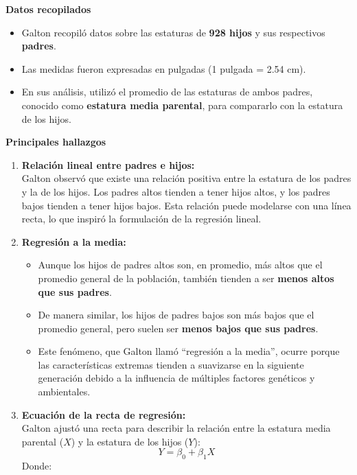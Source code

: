\documentclass[
  letterpaper,
  DIV=11,
  numbers=noendperiod]{scrreprt}
\providecommand{\tightlist}{%
  \setlength{\itemsep}{0pt}\setlength{\parskip}{0pt}}
\begin{document}
\begin{tcolorbox}[enhanced jigsaw, leftrule=.75mm, breakable, colbacktitle=quarto-callout-tip-color!10!white, bottomrule=.15mm, colframe=quarto-callout-tip-color-frame, toprule=.15mm, colback=white, coltitle=black, bottomtitle=1mm, left=2mm, title=\textcolor{quarto-callout-tip-color}{\faLightbulb}\hspace{0.5em}{Estudios de Galton sobre estatura}, opacityback=0, arc=.35mm, opacitybacktitle=0.6, toptitle=1mm, titlerule=0mm, rightrule=.15mm]

\textbf{Datos recopilados}

\begin{itemize}
\tightlist
\item
  Galton recopiló datos sobre las estaturas de \textbf{928 hijos} y sus
  respectivos \textbf{padres}.
\item
  Las medidas fueron expresadas en pulgadas (1 pulgada = 2.54 cm).\\
\item
  En sus análisis, utilizó el promedio de las estaturas de ambos padres,
  conocido como \textbf{estatura media parental}, para compararlo con la
  estatura de los hijos.
\end{itemize}

\textbf{Principales hallazgos}

\begin{enumerate}
\def\labelenumi{\arabic{enumi}.}
\item
  \textbf{Relación lineal entre padres e hijos:}\\
  Galton observó que existe una relación positiva entre la estatura de
  los padres y la de los hijos. Los padres altos tienden a tener hijos
  altos, y los padres bajos tienden a tener hijos bajos. Esta relación
  puede modelarse con una línea recta, lo que inspiró la formulación de
  la regresión lineal.
\item
  \textbf{Regresión a la media:}

  \begin{itemize}
  \tightlist
  \item
    Aunque los hijos de padres altos son, en promedio, más altos que el
    promedio general de la población, también tienden a ser
    \textbf{menos altos que sus padres}.\\
  \item
    De manera similar, los hijos de padres bajos son más bajos que el
    promedio general, pero suelen ser \textbf{menos bajos que sus
    padres}.\\
  \item
    Este fenómeno, que Galton llamó ``regresión a la media'', ocurre
    porque las características extremas tienden a suavizarse en la
    siguiente generación debido a la influencia de múltiples factores
    genéticos y ambientales.
  \end{itemize}
\item
  \textbf{Ecuación de la recta de regresión:}\\
  Galton ajustó una recta para describir la relación entre la estatura
  media parental (\(X\)) y la estatura de los hijos (\(Y\)): \[
  Y = \beta_0 + \beta_1 X
  \] Donde:


\end{enumerate}
\end{tcolorbox}
\end{document}
